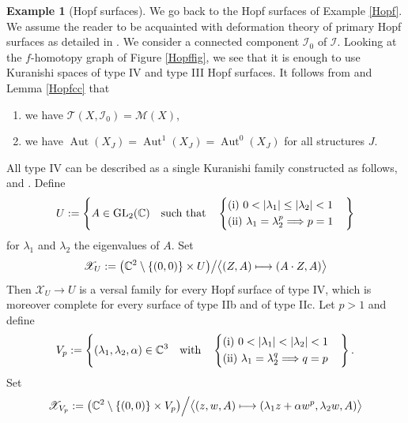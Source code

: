 \documentclass[JEP,XML,SOM,Unicode]{cedram}
\let\mathcal\mathscr
\def\mto{\mathchoice{\longmapsto}{\mapsto}{\mapsto}{\mapsto}}
\newcommand{\GL}{\mathrm{GL}}
\DeclareMathOperator{\Aut}{Aut}
\theoremstyle{plain}
\theoremstyle{definition}
\newtheorem{example}[theorem]{Example}
\theoremstyle{remark}
\numberwithin{equation}{section}
\newcommand{\CC}{{\mathbb{C}}}
\newcommand{\cI}{\mathcal{I}}
\begin{document}
\begin{example}[Hopf surfaces]
\label{Hopfbis}
We go back to the Hopf surfaces of Example \ref{Hopf}. We assume the reader to be acquainted with deformation theory of primary Hopf surfaces as detailed in \cite{We}. We consider a connected component $\cI_0$ of $\cI$. Looking at the $f$-homotopy graph of Figure \ref{Hopffig}, we see that it is enough to use Kuranishi spaces of type IV and type III Hopf surfaces. It follows from \cite{We} and Lemma \ref{Hopfcc} that
\begin{enumerate}
\item
we have $\mathcal T(X,\cI_0)=\mathcal M(X)$,
\item
we have $\Aut(X_J)=\Aut^1(X_J)=\Aut^0(X_J)$ for all structures $J$.
\end{enumerate}
All type IV can be described as a single Kuranishi family constructed as follows, \cf \cite{We} and \cite{Dabrowski}. Define\vspace*{-3pt}
\begin{equation}
\label{typeIV}
U:=\left\{
A\in \GL_2(\CC)
\quad\text{such that}\quad\left\{\begin{aligned}&\textup{(i)}\ 0<\vert\lambda_1\vert \leq \vert\lambda_2\vert<1\cr
&\textup{(ii)}\ \lambda_1 =\lambda_2^p\Longrightarrow p=1
\end{aligned}\right.
\right\}
\end{equation}
for $\lambda_1$ and $\lambda_2$ the eigenvalues of $A$.
Set
\begin{equation}
\label{typeIVfamily}
\mathcal X_U:=\big (\CC^2\setminus\{(0,0)\}\times U\big )\big /\big\langle (Z,A)\mto (A\cdot Z, A)\big\rangle
\end{equation}
Then $\mathcal X_U\to U$ is a versal family for every Hopf surface of type IV, which is moreover complete for every surface of type IIb and of type IIc. Let $p>1$ and define
\begin{equation}
\label{typeIIIp}
V_p:=\left\{
(\lambda_1,\lambda_2,\alpha)\in\CC^3
\quad\text{with}\quad\left\{\begin{aligned}&\textup{(i)}\ 0<\vert\lambda_1\vert < \vert\lambda_2\vert<1\cr
&\textup{(ii)}\ \lambda_1 =\lambda_2^q\Longrightarrow q=p
\end{aligned}\right .
\right\}.
\end{equation}
Set
\begin{equation}
\label{typeIIIpfamily}
\mathcal X_{V_p}:=\big (\CC^2\setminus\{(0,0)\}\times V_p\big )\Big /\big\langle (z,w,A)\mto (\lambda_1z+\alpha w^p,\lambda_2w, A)\big\rangle

\end{equation}
\end{example}
\end{document}
